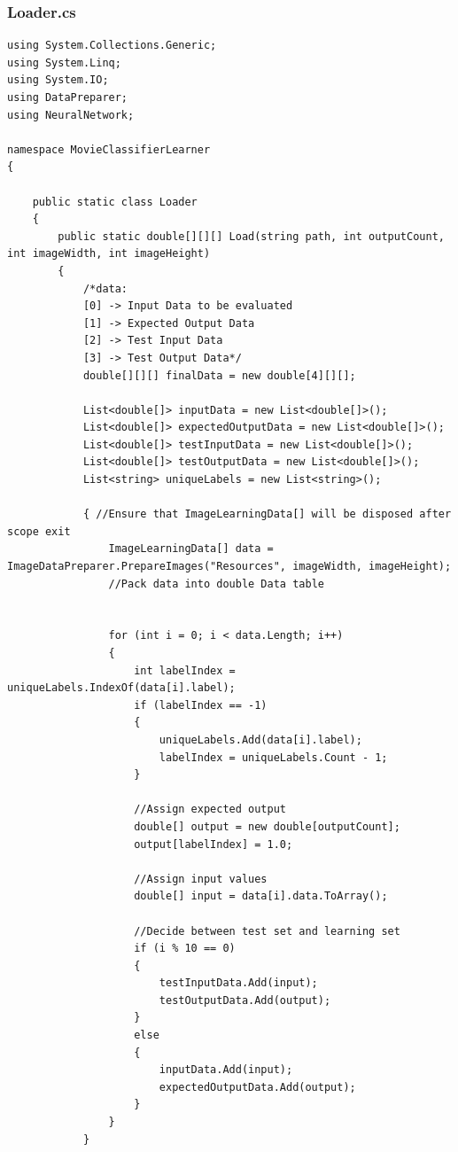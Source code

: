 \documentclass[12pt,a4paper]{article}
\begin{document}
\subsubsection*{Loader.cs}
\begin{lstlisting}
using System.Collections.Generic;
using System.Linq;
using System.IO;
using DataPreparer;
using NeuralNetwork;

namespace MovieClassifierLearner
{

    public static class Loader
    {
        public static double[][][] Load(string path, int outputCount, int imageWidth, int imageHeight)
        {
            /*data:
            [0] -> Input Data to be evaluated
            [1] -> Expected Output Data
            [2] -> Test Input Data
            [3] -> Test Output Data*/
            double[][][] finalData = new double[4][][];

            List<double[]> inputData = new List<double[]>();
            List<double[]> expectedOutputData = new List<double[]>();
            List<double[]> testInputData = new List<double[]>();
            List<double[]> testOutputData = new List<double[]>();
            List<string> uniqueLabels = new List<string>();

            { //Ensure that ImageLearningData[] will be disposed after scope exit
                ImageLearningData[] data = ImageDataPreparer.PrepareImages("Resources", imageWidth, imageHeight);
                //Pack data into double Data table


                for (int i = 0; i < data.Length; i++)
                {
                    int labelIndex = uniqueLabels.IndexOf(data[i].label);
                    if (labelIndex == -1)
                    {
                        uniqueLabels.Add(data[i].label);
                        labelIndex = uniqueLabels.Count - 1;
                    }

                    //Assign expected output
                    double[] output = new double[outputCount];
                    output[labelIndex] = 1.0;

                    //Assign input values
                    double[] input = data[i].data.ToArray();

                    //Decide between test set and learning set
                    if (i % 10 == 0)
                    {
                        testInputData.Add(input);
                        testOutputData.Add(output);
                    }
                    else
                    {
                        inputData.Add(input);
                        expectedOutputData.Add(output);
                    }
                }
            }


\end{lstlisting}
\end{document}
